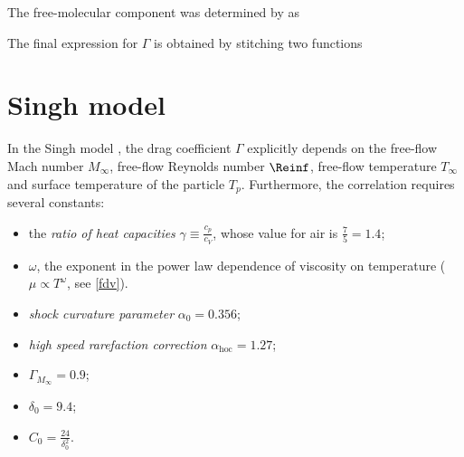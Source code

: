     The free-molecular component was determined by \citet{patterson1971} as

    The final expression for $\Gamma$ is obtained by stitching two functions

\section{Singh model} \label{DS}
    In the Singh model \citep{singh+2020}, the drag coefficient $\Gamma$ explicitly depends on the
    free-flow Mach number $M_\infty$, free-flow Reynolds number $\Reinf$,
    free-flow temperature $T_\infty$ and surface temperature of the particle $T_p$.
    Furthermore, the correlation requires several constants:
    \begin{itemize}
        \item the \emph{ratio of heat capacities} $\gamma \equiv \frac{c_p}{c_V}$,
            whose value for air is $\frac{7}{5} = \num{1.4}$;
        \item $\omega$, the exponent in the power law dependence
            of viscosity on temperature ($\mu \propto T^\omega$, see \cref{fdv}).
        \item \emph{shock curvature parameter} $\alpha_0 = \num{0.356}$;
        \item \emph{high speed rarefaction correction} $\alpha_\mathrm{hoc} = \num{1.27}$;
        \item \emph{} $\Gamma_{M_\infty} = \num{0.9}$;
        \item \emph{} $\delta_0 = \num{9.4}$;
        \item $C_0 = \frac{24}{\delta_0^2}$.
    \end{itemize}

